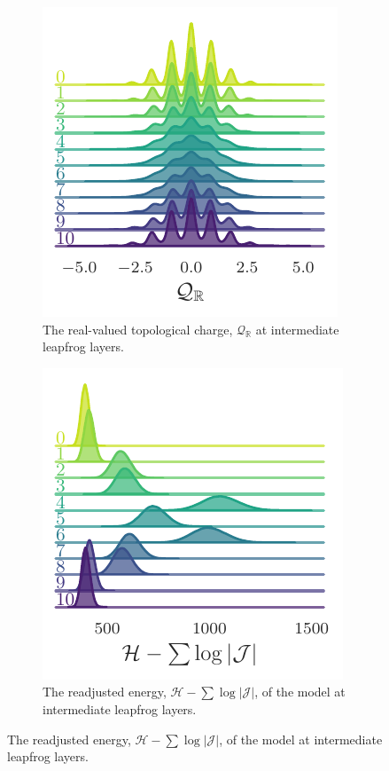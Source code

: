 \documentclass{article} %
\begin{document}
\begin{figure}[htpb]
\begin{subfigure}{0.31\textwidth}
      \includegraphics[width=\textwidth]{figures/sinQf_1755.pdf}
      \caption{\label{fig:sinQf}The real-valued topological charge, \(\mathcal{Q}_{\mathbb{R}}\) at intermediate leapfrog layers.}%
   \end{subfigure}
   \hfill
   \begin{subfigure}{0.31\textwidth}
      \includegraphics[width=\textwidth]{figures/extras/hwf.pdf}
      \caption{\label{fig:hwf}The readjusted energy, \(\mathcal{H}-\sum\log|\mathcal{J}|\), of the model at intermediate leapfrog layers.}
   \end{subfigure}
\end{figure}
%
\end{document}
